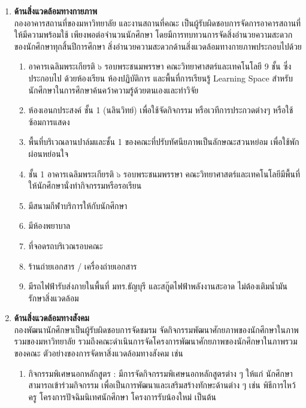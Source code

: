 \begin{enumerate}
\item {\bf ด้านสิ่งแวดล้อมทางกายภาพ}\\ 
กองอาคารสถานที่ของมหาวิทยาลัย และงานสถานที่คณะ เป็นผู้รับผิดชอบการจัดการอาคารสถานที่ ให้มีความพร้อมใช้ เพียงพอต่อจำนวนนักศึกษา โดยมีการทบทวนการจัดสิ่งอำนวยความสะดวกของนักศึกษาทุกสิ้นปีการศึกษา สิ่งอำนวยความสะดวกด้านสิ่งแวดล้อมทางกายภาพประกอบไปด้วย
\begin{enumerate}[label=(\arabic*), leftmargin=1cm]
\item อาคารเฉลิมพระเกียรติ ๖ รอบพระชนมพรรษา คณะวิทยาศาสตร์และเทคโนโลยี 9 ชั้น  ซึ่งประกอบไป
ด้วยห้องเรียน ห้องปฏิบัติการ และพื้นที่การเรียนรู้ Learning Space สำหรับนักศึกษาในการศึกษาค้นคว้าความรู้ด้วยตนเองและทำวิจัย 
\item ห้องเอนกประสงค์ ชั้น 1 (นลินวิทย์) เพื่อใช้จัดกิจกรรม หรือเวทีการประกวดต่างๆ หรือใช้ซ้อมการแสดง 
\item พื้นที่บริเวณลานปาล์มและชั้น 1 ของคณะที่ปรับทัศนียภาพเป็นลักษณะสวนหย่อม เพื่อใช้พักผ่อนหย่อนใจ 
\item ชั้น 1 อาคารเฉลิมพระเกียรติ ๖ รอบพระชนมพรรษา คณะวิทยาศาสตร์และเทคโนโลยีมีพื้นที่ให้นักศึกษานั่งทำกิจกรรมหรือรอเรียน
\item มีสนามกีฬาบริการให้กับนักศึกษา
\item มีห้องพยาบาล 
\item ที่จอดรถบริเวณรอบคณะ
\item ร้านถ่ายเอกสาร / เครื่องถ่ายเอกสาร 
\item มีรถไฟฟ้ารับส่งภายในพื้นที่ มทร.ธัญบุรี  และสกู๊ตไฟฟ้าพลังงานสะอาด ไม่ต้องเติมน้ำมัน
 รักษาสิ่งแวดล้อม
\end{enumerate}
\item {\bf ด้านสิ่งแวดล้อมทางสังคม}\\ 
กองพัฒนานักศึกษาเป็นผู้รับผิดชอบการจัดชมรม จัดกิจกรรมพัฒนาศักยภาพของนักศึกษาในภาพรวมของมหาวิทยาลัย รวมถึงคณะดำเนินการจัดโครงการพัฒนาศักยภาพของนักศึกษาในภาพรวมของคณะ ตัวอย่างของการจัดหาสิ่งแวดล้อมทางสังคม เช่น 
\begin{enumerate}[label=(\arabic*), leftmargin=1cm]
\item กิจกรรมพิเศษนอกหลักสูตร :  มีการจัดกิจกรรมพิเศษนอกหลักสูตรต่าง ๆ ให้แก่ นักศึกษาสามารถเข้าร่วมกิจกรรม เพื่อเป็นการพัฒนาและเสริมสร้างทักษะด้านต่าง ๆ เช่น พิธีการไหว้ครู โครงการปัจฉิมนิเทศนักศึกษา โครงการรับน้องใหม่ เป็นต้น

\end{enumerate}
\end{enumerate}
